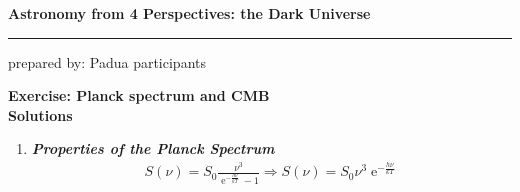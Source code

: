 \documentclass[a4paper,12pt]{article}
\newcommand{\question}[1]{\textbf{\textit{#1}}}
\newcommand{\HRule}{\rule{\linewidth}{0.3mm}}
\DeclareMathOperator{\e}{e}
\newcommand{\enkt}{\e^{-\frac{h\nu}{kT}}}
\begin{document}
 	\pagestyle{empty}
	
	\begin{center}
		\LARGE \textbf{Astronomy from 4 Perspectives: the Dark Universe}
		\HRule
	\end{center}
	\begin{flushright}
		prepared by: Padua participants
	\end{flushright}
	\begin{center}
		{\Large \textbf{Exercise: Planck spectrum and CMB}}\\
		\vspace*{2mm}
		{\Large \textbf{Solutions}}
		
	\end{center}
	\vspace{5mm}
	
	\begin{enumerate}
	\item \question{Properties of the Planck Spectrum}\\
	\begin{align}
	S(\nu) =S_0\frac{\nu^3}{\enkt -1} \Rightarrow S(\nu)=S_0\nu^3 \enkt
	\end{align}
	

\end{enumerate}
\end{document}
